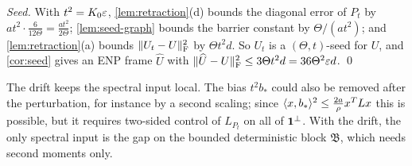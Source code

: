 \emph{Seed.} With $t^2=K_0\varepsilon$, \cref{lem:retraction}(d) bounds the diagonal
error of $P_t$ by $at^2\cdot\frac6{12\Theta}=\frac{at^2}{2\Theta}$;
\cref{lem:seed-graph} bounds the barrier constant by $\Theta/(at^2)$; and
\cref{lem:retraction}(a) bounds $\lVert U_t-U\rVert_{\mathrm F}^2$ by $\Theta t^2d$. So $U_t$ is a
$(\Theta,t)$-seed for $U$, and \cref{cor:seed} gives an ENP frame $\widehat U$
with $\lVert \widehat U-U\rVert_{\mathrm F}^2\le3\Theta t^2d=36\Theta^2\varepsilon d$.
\qed

\begin{remark}
The drift keeps the spectral input local. The bias $t^2b_*$ could also be
removed after the perturbation, for instance by a second scaling; since
$\langle x,b_*\rangle^2\le\frac{2a}\rho x^TLx$ this is possible, but it requires two-sided
control of $L_{P_t}$ on all of $\mathbf 1^\perp$. With the drift, the only spectral
input is the gap on the bounded deterministic block $\mathfrak B$, which needs
second moments only.
\end{remark}

